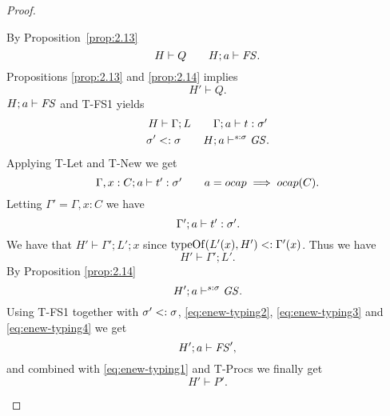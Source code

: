 \begin{proof}
\begin{description}
\begin{description}
\begin{description}
              By Proposition~\ref{prop:2.13}
              \begin{equation} 
                H \vdash Q \quad\quad H; a \vdash \mathit{FS}.
              \end{equation}
              Propositions \ref{prop:2.13} and \ref{prop:2.14} implies
              \begin{equation} \label{eq:enew-typing1}
                H' \vdash Q.
              \end{equation}
              $H;a \vdash \mathit{FS}$ and {\sc T-FS1} yields
              \begin{equation}
                \begin{gathered}
                  H \vdash \Gamma; L \quad\quad \mbox{$\Gamma;a\vdash t:\sigma'$}
                  \\
                  \sigma' <: \sigma \quad\quad H;a \vdash^{s: \sigma} \mathit{GS}.
                \end{gathered} 
              \end{equation}
              Applying {\sc T-Let} and {\sc T-New} we get
              \begin{equation} \label{eq:enew-typing5}
                \mbox{$\Gamma, x: C;a\vdash t':\sigma'$} \quad\quad a = \mbox{$ocap$}
                \implies \mbox{$ocap$}(C).
              \end{equation}
              Letting $\Gamma' = \Gamma, x: C$ we have
              \begin{equation} \label{eq:enew-typing2}
                \mbox{$\Gamma';a\vdash t':\sigma'$}.
              \end{equation}
              We have that $H' \vdash \Gamma';L';x$ since $\mbox{$\mathrm{typeOf}$}(L'(x), H')
              <: \Gamma'(x)$. Thus we have
              \begin{equation} \label{eq:enew-typing3}
                H' \vdash \Gamma'; L'.
              \end{equation}
              By Proposition \ref{prop:2.14}
              \begin{equation} \label{eq:enew-typing4}
                H';a \vdash^{s: \sigma} \mathit{GS}.
              \end{equation}
              Using {\sc T-FS1} together with $\sigma' <: \sigma$, \eqref{eq:enew-typing2},
              \eqref{eq:enew-typing3} and \eqref{eq:enew-typing4} we get
              \begin{equation}
                H';a \vdash \mathit{FS}',
              \end{equation}
              and combined with \eqref{eq:enew-typing1} and {\sc T-Procs} we finally
              get
              \begin{equation}
                H' \vdash P'.
              \end{equation}


\end{description}
\end{description}
\end{description}
\end{proof}
